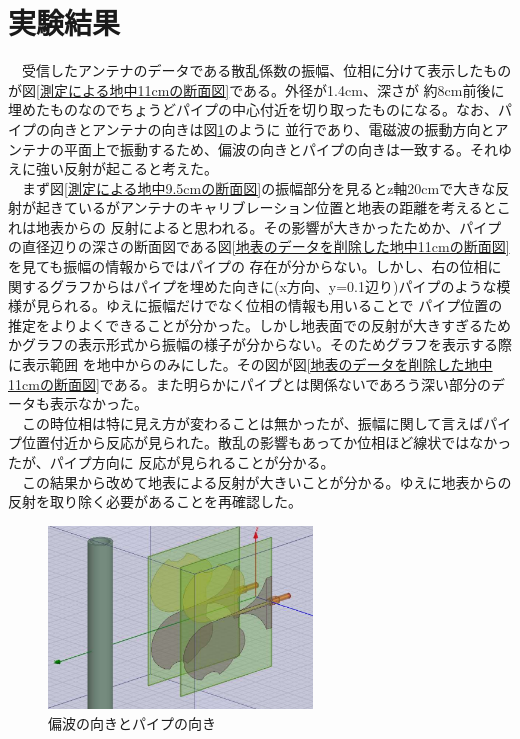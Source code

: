 \documentclass[12pt,a4paper]{jsreport}
\begin{document}
\section{実験結果}
　受信したアンテナのデータである散乱係数の振幅、位相に分けて表示したものが図\ref{測定による地中11cmの断面図}である。外径が1.4cm、深さが
約8cm前後に埋めたものなのでちょうどパイプの中心付近を切り取ったものになる。なお、パイプの向きとアンテナの向きは図\ref{偏波の向きとパイプの向き}のように
並行であり、電磁波の振動方向とアンテナの平面上で振動するため、偏波の向きとパイプの向きは一致する。それゆえに強い反射が起こると考えた。
\\　まず図\ref{測定による地中9.5cmの断面図}の振幅部分を見るとz軸20cmで大きな反射が起きているがアンテナのキャリブレーション位置と地表の距離を考えるとこれは地表からの
反射によると思われる。その影響が大きかったためか、パイプの直径辺りの深さの断面図である図\ref{地表のデータを削除した地中11cmの断面図}を見ても振幅の情報からではパイプの
存在が分からない。しかし、右の位相に関するグラフからはパイプを埋めた向きに(x方向、y=0.1辺り)パイプのような模様が見られる。ゆえに振幅だけでなく位相の情報も用いることで
パイプ位置の推定をよりよくできることが分かった。しかし地表面での反射が大きすぎるためかグラフの表示形式から振幅の様子が分からない。そのためグラフを表示する際に表示範囲
を地中からのみにした。その図が図\ref{地表のデータを削除した地中11cmの断面図}である。また明らかにパイプとは関係ないであろう深い部分のデータも表示なかった。
\\　この時位相は特に見え方が変わることは無かったが、振幅に関して言えばパイプ位置付近から反応が見られた。散乱の影響もあってか位相ほど線状ではなかったが、パイプ方向に
反応が見られることが分かる。
\\　この結果から改めて地表による反射が大きいことが分かる。ゆえに地表からの反射を取り除く必要があることを再確認した。

 \begin{figure}[h]
  \begin{center}
   \includegraphics[width=7cm]{./image/antennaimage.png}
  \caption{偏波の向きとパイプの向き}\label{偏波の向きとパイプの向き}
  \end{center}
  \end{figure}
\end{document}
